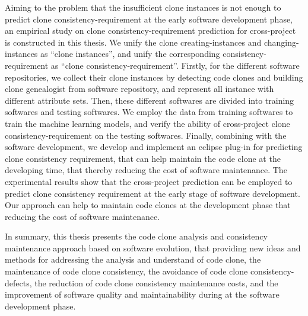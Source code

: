 {Aiming to the problem that the insufficient clone instances is not enough to predict clone consistency-requirement at the early software development phase, an empirical study on clone consistency-requirement prediction for cross-project is constructed in this thesis.
We unify the clone creating-instances and changing-instances as ``clone instances'', and unify the corresponding consistency-requirement as ``clone consistency-requirement''.
Firstly, for the different software repositories, we collect their clone instances by detecting code clones and building clone genealogist from software repository, and represent all instance with different attribute sets.
Then, these different softwares are divided into training softwares and testing softwares. We employ the data from training softwares to train the machine learning models, and verify the ability of cross-project clone consistency-requirement on the testing softwares.
Finally, combining with the software development, we develop and implement an eclipse plug-in for predicting clone consistency requirement, that can help maintain the code clone at the developing time, that thereby reducing the cost of software maintenance.
The experimental results show that the cross-project prediction can be employed to predict clone consistency requirement at the early stage of software development.
Our approach can help to maintain code clones at the development phase that reducing the cost of software maintenance.

In summary, this thesis presents the code clone  analysis and consistency maintenance approach based on software evolution, that providing new ideas and methods for addressing the analysis and understand of code clone, the maintenance of code clone consistency, the avoidance of code clone consistency-defects, the reduction of code clone consistency maintenance costs, and the improvement of software quality and maintainability during at the software development phase.
}

\makecover
\clearpage 
